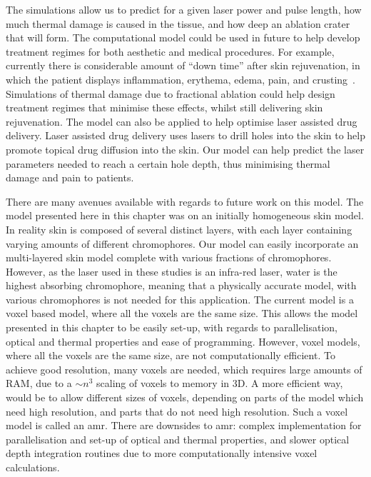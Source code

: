 The simulations allow us to predict for a given laser power and pulse length, how much thermal damage is caused in the tissue, and how deep an ablation crater that will form. The computational model could be used in future to help develop treatment regimes for both aesthetic and medical procedures. For example, currently there is considerable amount of ``down time'' after skin rejuvenation, in which the patient displays inflammation, erythema, edema, pain, and crusting~\cite{lapidoth2014fractional,trelles2011safe,kohl2015fractional}. Simulations of thermal damage due to fractional ablation could help design treatment regimes that minimise these effects, whilst still delivering skin rejuvenation.
The model can also be applied to help optimise laser assisted drug delivery. 
Laser assisted drug delivery uses lasers to drill holes into the skin to help promote topical drug diffusion into the skin.
Our model can help predict the laser parameters needed to reach a certain hole depth, thus minimising thermal damage and pain to patients.

There are many avenues available with regards to future work on this model. The model presented here in this chapter was on an initially homogeneous skin model. In reality skin is composed of several distinct layers, with each layer containing varying amounts of different chromophores. Our model can easily incorporate an multi-layered skin model complete with various fractions of chromophores. However, as the laser used in these studies is an infra-red laser, water is the highest absorbing chromophore, meaning that a physically accurate model, with various chromophores is not needed for this application.
The current model is a voxel based model, where all the voxels are the same size. This allows the model presented in this chapter to be easily set-up, with regards to parallelisation, optical and thermal properties and ease of programming. However, voxel models, where all the voxels are the same size, are not computationally efficient. To achieve good resolution, many voxels are needed, which requires large amounts of RAM, due to a $\sim n^3$ scaling of voxels to memory in 3D. A more efficient way, would be to allow different sizes of voxels, depending on parts of the model which need high resolution, and parts that do not need high resolution. Such a voxel model is called an \gls*{amr}. There are downsides to \gls*{amr}: complex implementation for parallelisation and set-up of optical and thermal properties, and slower optical depth integration routines due to more computationally intensive voxel calculations.


